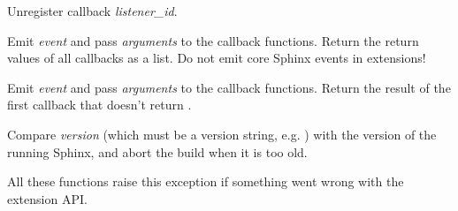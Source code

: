 \documentclass[letterpaper,10pt,english]{sphinxmanual}
\begin{document}

\begin{fulllineitems}
\label{ext/appapi:sphinx.application.Sphinx.disconnect}
Unregister callback \emph{listener\_id}.

\end{fulllineitems}


\begin{fulllineitems}
\label{ext/appapi:sphinx.application.Sphinx.emit}
Emit \emph{event} and pass \emph{arguments} to the callback functions.  Return the
return values of all callbacks as a list.  Do not emit core Sphinx events
in extensions!

\end{fulllineitems}


\begin{fulllineitems}
\label{ext/appapi:sphinx.application.Sphinx.emit_firstresult}
Emit \emph{event} and pass \emph{arguments} to the callback functions.  Return the
result of the first callback that doesn't return .


\end{fulllineitems}


\begin{fulllineitems}
\label{ext/appapi:sphinx.application.Sphinx.require_sphinx}
Compare \emph{version} (which must be a  version string,
e.g. ) with the version of the running Sphinx, and abort the build
when it is too old.


\end{fulllineitems}


\begin{fulllineitems}
\label{ext/appapi:sphinx.application.ExtensionError}
All these functions raise this exception if something went wrong with the
extension API.

\end{fulllineitems}
\end{document}
